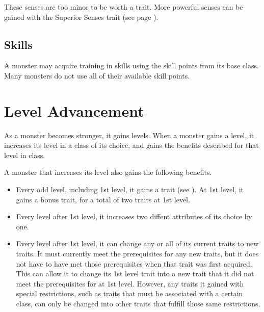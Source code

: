         These senses are too minor to be worth a trait.
        More powerful senses can be gained with the Superior Senses trait (see page ).

    \subsection{Skills}
        A monster may acquire training in skills using the skill points from its base class.
        Many monsters do not use all of their available skill points.

\section{Level Advancement}\label{Level Advancement}

    As a monster becomes stronger, it gains levels.
    When a monster gains a level, it increases its level in a class of its choice, and gains the benefits described for that level in class.

    A monster that increases its level also gains the following benefits.
    \begin{itemize}
        \item Every odd level, including 1st level, it gains a trait (see ).
            At 1st level, it gains a bonus trait, for a total of two traits at 1st level.
        \item Every level after 1st level, it increases two diffent attributes of its choice by one.
        \item Every level after 1st level, it can change any or all of its current traits to new traits.
            It must currently meet the prerequisites for any new traits, but it does not have to have met those prerequisites when that trait was first acquired.
            This can allow it to change its 1st level trait into a new trait that it did not meet the prerequisites for at 1st level.
            However, any traits it gained with special restrictions, such as traits that must be associated with a certain class, can only be changed into other traits that fulfill those same restrictions.
    \end{itemize}
